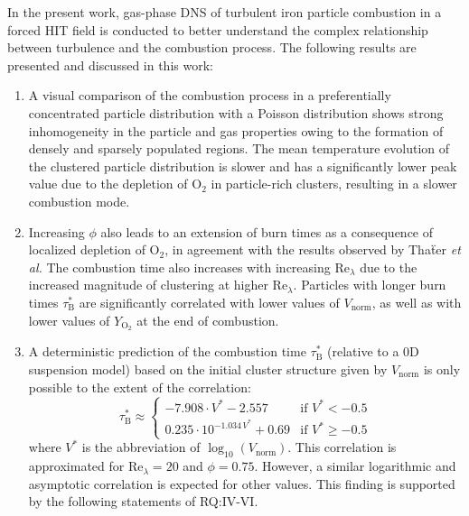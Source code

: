 \documentclass[times,twocolumn,final]{elsarticle}
\newcommand{\mrm}[1]{\mathrm{#1}}
\newcommand{\St}{\mathrm{St}}
\newcommand{\Rel}{\mathrm{Re}_\lambda}
\newcommand{\YO}{Y_\mathrm{O_2}}
\newcommand{\taub}{\tau_\mathrm{B}}
\begin{document}
In the present work, gas-phase DNS of turbulent iron particle combustion in a forced HIT field is conducted to better understand the complex relationship between turbulence and the combustion process. The following results are presented and discussed in this work:
\begin{enumerate}[label=RQ:\Roman*,leftmargin=1.1cm, wide]
\itemsep0em
    \item A visual comparison of the combustion process in a preferentially concentrated particle distribution with a Poisson distribution shows strong inhomogeneity in the particle and gas properties owing to the formation of densely and sparsely populated regions. The mean temperature evolution of the clustered particle distribution is slower and has a significantly lower peak value due to the depletion of $\mrm{O_2}$ in particle-rich clusters, resulting in a slower combustion mode. 
    \item Increasing $\phi$ also leads to an extension of burn times as a consequence of localized depletion of $\mrm{O_2}$, in agreement with the results observed by Tha\"ter \textit{et al.} The combustion time also increases with increasing $\Rel$ due to the increased magnitude of clustering at higher $\Rel$. Particles with longer burn times $\taub^*$ are significantly correlated with lower values of $V_\mrm{norm}$, as well as with lower values of $\YO$ at the end of combustion. 

    \item A deterministic prediction of the combustion time $\taub^*$ (relative to a 0D suspension model) based on the initial cluster structure given by $V_\mrm{norm}$ is only possible to the extent of the correlation:
    \begin{equation}
    \taub^* \approx 
    \begin{cases}
      -7.908 \cdot V^* - 2.557       & \text{if } V^* < -0.5 \\
      0.235 \cdot 10^{-1.034\, V^*} + 0.69      & \text{if } V^* \geq -0.5
    \end{cases} 
    \end{equation}
    \noindent where $V^*$ is the abbreviation of $\log_{10}(V_\mrm{norm})$. This correlation is approximated for $\Rel=20$ and $\phi=0.75$. However, a similar logarithmic and asymptotic correlation is expected for other values. This finding is supported by the following statements of RQ:IV-VI.
    

\end{enumerate}
\end{document}
